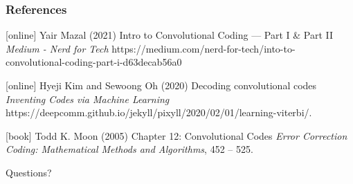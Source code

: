 \documentclass{beamer}
\newcommand{\<}				{\langle}
\renewcommand{\>}      		{\rangle}
\begin{document}
\begin{frame}
\frametitle{References}
\footnotesize{
\begin{thebibliography}{9} 

[online]
 Yair Mazal (2021)
\newblock Intro to Convolutional Coding — Part I & Part II
\newblock \emph{Medium - Nerd for Tech} https://medium.com/nerd-for-tech/into-to-convolutional-coding-part-i-d63decab56a0

[online]
 Hyeji Kim and Sewoong Oh (2020)
\newblock Decoding convolutional codes
\newblock \emph{Inventing Codes via Machine Learning} https://deepcomm.github.io/jekyll/pixyll/2020/02/01/learning-viterbi/.

[book]
 Todd K. Moon (2005)
\newblock Chapter 12: Convolutional Codes
\newblock \emph{Error Correction Coding: Mathematical Methods and Algorithms}, 452 -- 525.

\end{thebibliography}
}
\end{frame}


\begin{frame}
\Huge{\centerline{Questions?}}
\end{frame}

\end{document}
